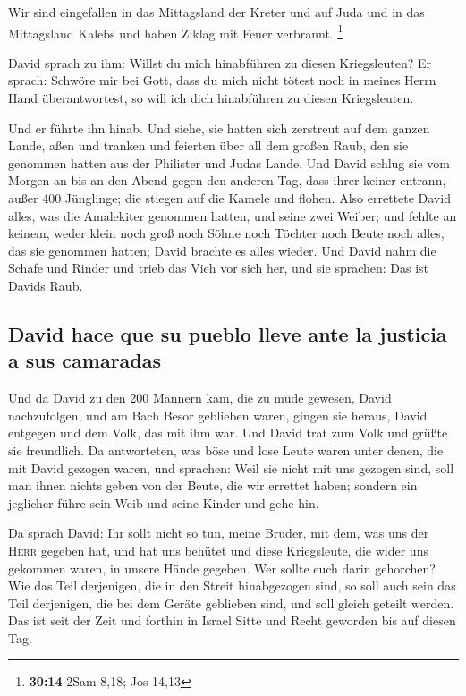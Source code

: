  Wir sind eingefallen in das Mittagsland der Kreter und
auf Juda und in das Mittagsland Kalebs und haben Ziklag mit Feuer
verbrannt. \footnote{\textbf{30:14} 2Sam 8,18; Jos 14,13}

 David sprach zu ihm: Willst du mich hinabführen zu
diesen Kriegsleuten? Er sprach: Schwöre mir bei Gott, dass du mich nicht
tötest noch in meines Herrn Hand überantwortest, so will ich dich
hinabführen zu diesen Kriegsleuten.

 Und er führte ihn hinab. Und siehe, sie hatten sich
zerstreut auf dem ganzen Lande, aßen und tranken und feierten über all
dem großen Raub, den sie genommen hatten aus der Philister und Judas
Lande.  Und David schlug sie vom Morgen an bis an den
Abend gegen den anderen Tag, dass ihrer keiner entrann, außer 400
Jünglinge; die stiegen auf die Kamele und flohen.  Also
errettete David alles, was die Amalekiter genommen hatten, und seine
zwei Weiber;  und fehlte an keinem, weder klein noch groß
noch Söhne noch Töchter noch Beute noch alles, das sie genommen hatten;
David brachte es alles wieder.  Und David nahm die Schafe
und Rinder und trieb das Vieh vor sich her, und sie sprachen: Das ist
Davids Raub.

\hypertarget{david-hace-que-su-pueblo-lleve-ante-la-justicia-a-sus-camaradas}{%
\subsection{David hace que su pueblo lleve ante la justicia a sus
camaradas}\label{david-hace-que-su-pueblo-lleve-ante-la-justicia-a-sus-camaradas}}

 Und da David zu den 200 Männern kam, die zu müde
gewesen, David nachzufolgen, und am Bach Besor geblieben waren, gingen
sie heraus, David entgegen und dem Volk, das mit ihm war. Und David trat
zum Volk und grüßte sie freundlich.  Da antworteten, was
böse und lose Leute waren unter denen, die mit David gezogen waren, und
sprachen: Weil sie nicht mit uns gezogen sind, soll man ihnen nichts
geben von der Beute, die wir errettet haben; sondern ein jeglicher führe
sein Weib und seine Kinder und gehe hin.

 Da sprach David: Ihr sollt nicht so tun, meine Brüder,
mit dem, was uns der \textsc{Herr} gegeben hat, und hat uns behütet und
diese Kriegsleute, die wider uns gekommen waren, in unsere Hände
gegeben.  Wer sollte euch darin gehorchen? Wie das Teil
derjenigen, die in den Streit hinabgezogen sind, so soll auch sein das
Teil derjenigen, die bei dem Geräte geblieben sind, und soll gleich
geteilt werden.  Das ist seit der Zeit und forthin in
Israel Sitte und Recht geworden bis auf diesen Tag.

